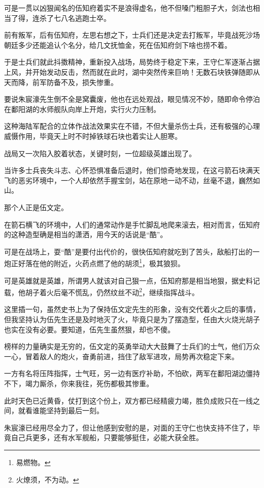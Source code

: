 \begin{multicols}{\theparacolNo}
		可是一贯以凶狠闻名的伍知府着实不是浪得虚名，他不但嗓门粗胆子大，剑法也相当了得，连杀了七八名逃跑士卒。

		前有叛军，后有伍知府，左思右想之下，士兵们还是决定去打叛军，毕竟战死沙场朝廷多少还能追认个名分，给几文抚恤金，死在伍知府剑下啥也捞不着。

		于是士兵们就此抖擞精神，重新投入战场，局势终于稳定下来，王守仁军逐渐占据上风，并开始发动反击，然而就在此时，湖中突然传来巨响！无数石块铁弹随即从天而降，前军防备不及，损失惨重。

		要说朱宸濠先生倒不全是窝囊废，他也在远处观战，眼见情况不妙，随即命令停泊在鄱阳湖的水师舰队向岸上开炮，实行火力压制。

		这种海陆军配合的立体作战法效果实在不错，不但大量杀伤士兵，还有极强的心理威慑作用，毕竟天上时不时掉铁球石块也着实让人胆寒。

		战局又一次陷入胶着状态，关键时刻，一位超级英雄出现了。

		当许多士兵丧失斗志、心怀恐惧准备后退时，他们惊奇地发现，在这弓箭石块满天飞的恶劣环境中，一个人却依然手握宝剑，站在原地一动不动，丝毫不退，巍然如山。

		那个人正是伍文定。

		在箭石横飞的环境中，人们的通常动作是手忙脚乱地爬来滚去，相对而言，伍知府的这种造型确是相当的潇洒，用今天的话说是“酷”。

		可是在战场上，耍“酷”是要付出代价的，很快伍知府就吃到了苦头，敌船打出的一炮正好落在他的附近，火药点燃了他的胡须\footnote{易燃物。}，极其狼狈。

		可是英雄就是英雄，所谓男人就该对自己狠一点，伍知府那是相当地狠，据史料记载，他胡子着火后毫不慌乱，仍然纹丝不动\footnote{火燎须，不为动。}，继续指挥战斗。

		这里插一句，虽然史书上为了保持伍文定先生的形象，没有交代着火之后的事情，但我坚持认为伍先生还是及时地灭了火，毕竟只是为了摆造型，任由大火烧光胡子也实在没有必要。要知道，伍先生虽然狠，却也不傻。

		榜样的力量确实是无穷的，伍文定的英勇举动大大鼓舞了士兵们的士气，他们万众一心，冒着敌人的炮火，奋勇前进，挡住了敌军进攻，局势再次稳定下来。

		一方有名将压阵指挥，士气旺，另一边有医疗补助，不怕砍，两军在鄱阳湖边僵持不下，竭力厮杀，你来我往，死伤都极其惨重。

		此时天色已近黄昏，仗打到这个份上，双方都已经精疲力竭，胜负成败只在一线之间，就看谁能坚持到最后一刻。

		朱宸濠已经用尽全力了，但让他感到安慰的是，对面的王守仁也快支持不住了，毕竟自己兵更多，还有水军舰船，只要能够挺住，必能大获全胜。


\end{multicols}

